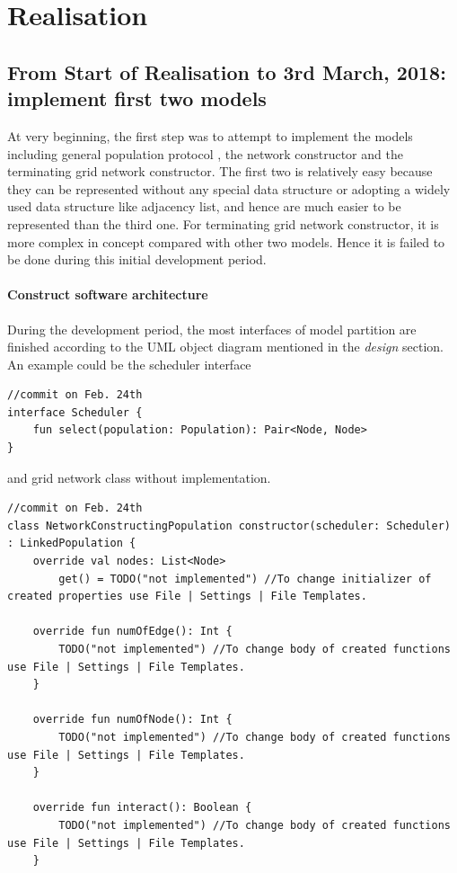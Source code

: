 \section{Realisation}
\subsection{From Start of Realisation to 3rd March, 2018: implement first two models}
At very beginning, the first step was to attempt to implement the
models including general population protocol \cite{AspnesR2007}, the network constructor \cite{MS16a} and
the terminating grid network constructor\cite{Mi17}. The first two is relatively easy because
they can be represented without any special data structure or adopting a widely used data structure like adjacency list,
and hence are much easier to be represented than the third one. For terminating grid network constructor, it is more complex in concept compared with
other two models. Hence it is failed to be done during this initial development period.
\paragraph{Construct software architecture}
During the development period, the most interfaces of model partition are finished according to the UML object
diagram mentioned in the \textit{design} section. An example could be the scheduler interface

\begin{lstlisting}[caption = {Interface design}, style = mykotlin]
//commit on Feb. 24th
interface Scheduler {
    fun select(population: Population): Pair<Node, Node>
}
\end{lstlisting}
\noindent
and grid network class without implementation.
\begin{lstlisting}[caption = {Grid network interface (early screenshot)}, style = mykotlin]
//commit on Feb. 24th
class NetworkConstructingPopulation constructor(scheduler: Scheduler) : LinkedPopulation {
    override val nodes: List<Node>
        get() = TODO("not implemented") //To change initializer of created properties use File | Settings | File Templates.

    override fun numOfEdge(): Int {
        TODO("not implemented") //To change body of created functions use File | Settings | File Templates.
    }

    override fun numOfNode(): Int {
        TODO("not implemented") //To change body of created functions use File | Settings | File Templates.
    }

    override fun interact(): Boolean {
        TODO("not implemented") //To change body of created functions use File | Settings | File Templates.
    }
\end{lstlisting}

